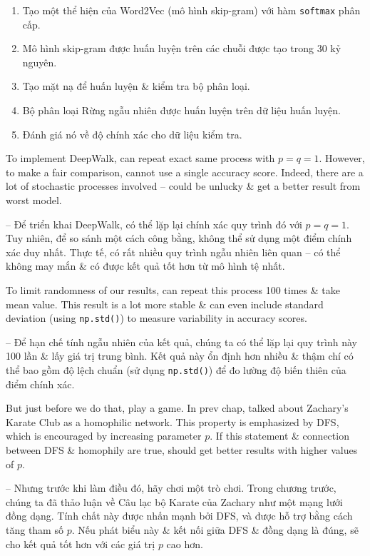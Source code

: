 \documentclass{article}
\begin{document}
\begin{itemize}
\begin{itemize}
\begin{enumerate}
            \item Tạo một thể hiện của Word2Vec (mô hình skip-gram) với hàm {\tt softmax} phân cấp.
            \item Mô hình skip-gram được huấn luyện trên các chuỗi được tạo trong 30 kỷ nguyên.
            \item Tạo mặt nạ để huấn luyện \& kiểm tra bộ phân loại.
            \item Bộ phân loại Rừng ngẫu nhiên được huấn luyện trên dữ liệu huấn luyện.
            \item Đánh giá nó về độ chính xác cho dữ liệu kiểm tra.
        \end{enumerate}
        To implement DeepWalk, can repeat exact same process with $p = q = 1$. However, to make a fair comparison, cannot use a single accuracy score. Indeed, there are a lot of stochastic processes involved -- could be unlucky \& get a better result from worst model.

        -- Để triển khai DeepWalk, có thể lặp lại chính xác quy trình đó với $p = q = 1$. Tuy nhiên, để so sánh một cách công bằng, không thể sử dụng một điểm chính xác duy nhất. Thực tế, có rất nhiều quy trình ngẫu nhiên liên quan -- có thể không may mắn \& có được kết quả tốt hơn từ mô hình tệ nhất.

        To limit randomness of our results, can repeat this process 100 times \& take mean value. This result is a lot more stable \& can even include standard deviation (using {\tt np.std()}) to measure variability in accuracy scores.

        -- Để hạn chế tính ngẫu nhiên của kết quả, chúng ta có thể lặp lại quy trình này 100 lần \& lấy giá trị trung bình. Kết quả này ổn định hơn nhiều \& thậm chí có thể bao gồm độ lệch chuẩn (sử dụng {\tt np.std()}) để đo lường độ biến thiên của điểm chính xác.

        But just before we do that, play a game. In prev chap, talked about Zachary's Karate Club as a homophilic network. This property is emphasized by DFS, which is encouraged by increasing parameter $p$. If this statement \& connection between DFS \& homophily are true, should get better results with higher values of $p$.

        -- Nhưng trước khi làm điều đó, hãy chơi một trò chơi. Trong chương trước, chúng ta đã thảo luận về Câu lạc bộ Karate của Zachary như một mạng lưới đồng dạng. Tính chất này được nhấn mạnh bởi DFS, và được hỗ trợ bằng cách tăng tham số $p$. Nếu phát biểu này \& kết nối giữa DFS \& đồng dạng là đúng, sẽ cho kết quả tốt hơn với các giá trị $p$ cao hơn.


\end{itemize}
\end{itemize}
\end{document}
